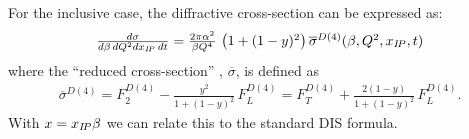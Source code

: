 For the inclusive case, the diffractive cross-section can be expressed as:
\begin{equation}
\begin{array}{lcl}
  \frac{d\sigma}{d\beta\,dQ^2dx_{{I\!P}}\,dt}
=
  \frac{2\pi\alpha^2}{\beta Q^4}\,
    \left( 1 +  (1-y)^2 \right) \overline\sigma^{D(4)}(\beta,Q^2,x_{{I\!P}},t)
\label{Dxs}
\end{array}
\end{equation}
where the ``reduced cross-section'' , $\overline\sigma$, is defined as
\begin{equation}
\begin{array}{lcl}
\overline\sigma^{D(4)}
 = F_2^{D(4)} - \frac{y^2}{1 +  (1-y)^2}\, F_L^{D(4)}
 = F_T^{D(4)} + \frac{2(1-y)}{1 +  (1-y)^2}\, F_L^{D(4)}.
\label{eq:sigred}
\end{array}
\end{equation}
With $x = x_{{I\!P}}\beta$ we can relate this to the standard DIS formula.
